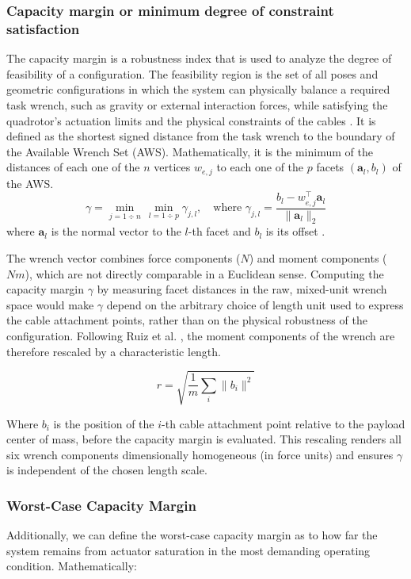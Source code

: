 \subsubsection{Capacity margin or minimum degree of constraint satisfaction}
The capacity margin is a robustness index that is used to analyze the degree of feasibility of a configuration. The feasibility region is the set of all poses and geometric configurations in which the system can physically balance a required task wrench, such as gravity or external interaction forces, while satisfying the quadrotor's actuation limits and the physical constraints of the cables \cite{erskine_wrench_2019}. It is defined as the shortest signed distance from the task wrench to the boundary of the Available Wrench Set (AWS). Mathematically, it is the minimum of the distances of each one of the $n$ vertices $w_{e, j}$ to each one of the $p$ facets $\left( \mathbf{a}_l, b_l\right)$ of the AWS.
\begin{equation}
    \gamma = \min_{j = 1 \div n} \, \min_{l = 1\div p} \gamma_{j, l}, \quad \text{where } \gamma_{j, l} = \frac{b_l - w_{e, j}^\top \mathbf{a}_l}{\|\mathbf{a}_l\|_2}
\end{equation}
where $\mathbf{a}_l$ is the normal vector to the $l$-th facet and $b_l$ is its offset \cite{pott_arachnis_2015}.

The wrench vector combines force components ($N$) and moment components ($Nm$), which are not directly comparable in a Euclidean sense. Computing the capacity margin $\gamma$ by measuring facet distances in the raw, mixed-unit wrench space would make $\gamma$ depend on the arbitrary choice of length unit used to express the cable attachment points, rather than on the physical robustness of the configuration. Following Ruiz et al. \cite{pott_arachnis_2015}, the moment components of the wrench are therefore rescaled by a characteristic length.

\begin{equation}
    r = \sqrt{\frac{1}{m} \sum_i \|b_i\|^2}
\end{equation}

Where $b_i$ is the position of the $i$-th cable attachment point relative to the payload center of mass, before the capacity margin is evaluated. This rescaling renders all six wrench components dimensionally homogeneous (in force units) and ensures $\gamma$ is independent of the chosen length scale.

\subsubsection{Worst-Case Capacity Margin}
Additionally, we can define the worst-case capacity margin as to how far the system remains from actuator saturation in the most demanding operating condition. Mathematically:

